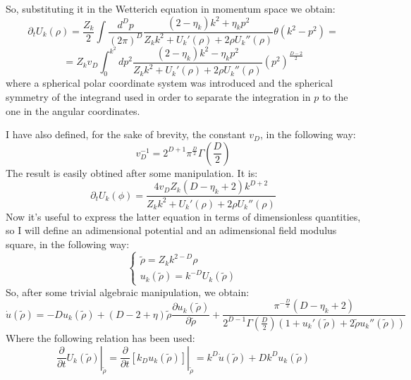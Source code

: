So, substituting it in the Wetterich equation in momentum space we obtain:
\begin{equation*}
 \partial_t U_k(\rho) = \frac{Z_k}{2}\int\frac{d^D p}{(2\pi)^D}\frac{(2 - \eta_k)k^2 + \eta_k p^2}{Z_kk^2 + U_k'(\rho) +  2\rho U_k''(\rho)}\theta(k^2 - p^2) =
\end{equation*}
\begin{equation}
 = Z_k v_D \int_0^{k^2} dp^2\frac{(2-\eta_k)k^2 - \eta_k p^2}{Z_k k^2 + U_k'(\rho) +  2\rho U_k''(\rho)}(p^2)^\frac{D-2}{2}
\end{equation}
where a spherical polar coordinate system was introduced and the spherical symmetry of the integrand used in order to separate the integration in $p$ to the one in the angular coordinates.

I have also defined, for the sake of brevity, the constant $v_D$, in the following way:
\begin{equation*}
 v_D^{-1} = 2^{D+1}\pi^\frac{D}{2}\Gamma\left(\frac{D}{2}\right)
\end{equation*}
The result is easily obtined after some manipulation. It is:
\begin{equation}
 \partial_tU_k(\phi) = \frac{4v_DZ_k(D -\eta_k +2)k^{D + 2}}{Z_k k^2 +  U_k'(\rho) +  2\rho U_k''(\rho)}
\end{equation}
Now it's useful to express the latter equation in terms of dimensionless quantities, so I will define an adimensional potential and an adimensional field 
modulus square, in the following way:
\begin{displaymath}
\left\{
\begin{array}{l}
\widetilde{\rho} = Z_k k^{2-D} \rho \\
u_k({\widetilde{\rho}}) = k^{-D} U_k(\widetilde{\rho})
\end{array}
\right.
\end{displaymath}
So, after some trivial algebraic manipulation, we obtain:
\begin{equation}
\dot{u}(\widetilde{\rho}) = -D  u_k(\widetilde{\rho}) +(D - 2 + \eta)\widetilde{\rho}\frac{\partial u_k(\widetilde{\rho})}{\partial \widetilde{\rho}} + \frac{\pi^{-\frac{D}{2}} (D- \eta_k +2)}{2^{D-1} \Gamma \left(\frac{D}{2}\right)(1 + u_k'(\widetilde{\rho}) + 2 \widetilde{\rho} u_k''(\widetilde{\rho}))}
\end{equation}
Where the following relation has been used:
\begin{equation}
\left.\frac{\partial}{\partial t} U_k(\widetilde{\rho})\right|_{\widetilde{\rho}} = \left.\frac{\partial}{\partial t} [k_Du_k(\widetilde{\rho})]\right|_{\widetilde{\rho}} = k^D\dot{u}(\widetilde{\rho}) + D k^D u_k(\widetilde{\rho})
\end{equation}

